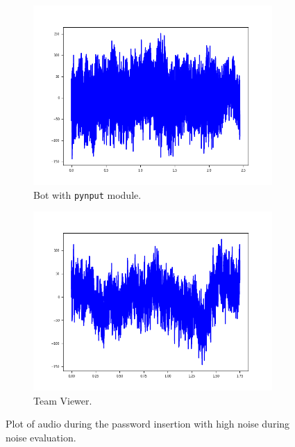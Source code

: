 \begin{figure}[H]
     \centering
	 \begin{subfigure}[b]{0.48\textwidth}
         \centering
         \includegraphics[width=\linewidth]{Images/Results/Bot/silence}
         \caption{\footnotesize{Bot with \texttt{pynput} module.}}
     \end{subfigure}
	 \hfill     
     \begin{subfigure}[b]{0.48\textwidth}
         \centering
         \includegraphics[width=\linewidth]{Images/Results/TeamViewer/silence}
         \caption{\footnotesize{Team Viewer.}}
     \end{subfigure}
     \caption{\footnotesize{Plot of audio during the password insertion with high noise during noise evaluation.}}\label{Results:silence_img}
\end{figure}
